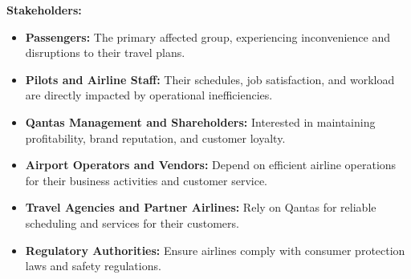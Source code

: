 \documentclass[12pt,a4paper]{article}
\begin{document}
\noindent\textbf{Stakeholders: }
\begin{itemize}
    \item \textbf{Passengers:} The primary affected group, experiencing inconvenience and disruptions to their travel plans.
    \item \textbf{Pilots and Airline Staff:} Their schedules, job satisfaction, and workload are directly impacted by operational inefficiencies.
    \item \textbf{Qantas Management and Shareholders:} Interested in maintaining profitability, brand reputation, and customer loyalty.
    \item \textbf{Airport Operators and Vendors:} Depend on efficient airline operations for their business activities and customer service.
    \item \textbf{Travel Agencies and Partner Airlines:} Rely on Qantas for reliable scheduling and services for their customers.
    \item \textbf{Regulatory Authorities:} Ensure airlines comply with consumer protection laws and safety regulations.
\end{itemize}
\end{document}

